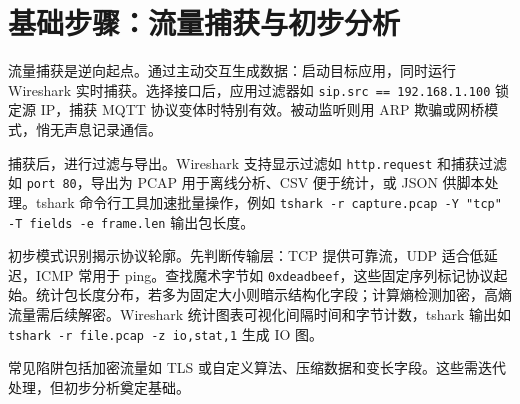 \chapter{基础步骤：流量捕获与初步分析}
流量捕获是逆向起点。通过主动交互生成数据：启动目标应用，同时运行 Wireshark 实时捕获。选择接口后，应用过滤器如 \texttt{sip.src == 192.168.1.100} 锁定源 IP，捕获 MQTT 协议变体时特别有效。被动监听则用 ARP 欺骗或网桥模式，悄无声息记录通信。\par
捕获后，进行过滤与导出。Wireshark 支持显示过滤如 \texttt{http.request} 和捕获过滤如 \texttt{port 80}，导出为 PCAP 用于离线分析、CSV 便于统计，或 JSON 供脚本处理。tshark 命令行工具加速批量操作，例如 \texttt{tshark -r capture.pcap -Y "tcp" -T fields -e frame.len} 输出包长度。\par
初步模式识别揭示协议轮廓。先判断传输层：TCP 提供可靠流，UDP 适合低延迟，ICMP 常用于 ping。查找魔术字节如 \texttt{0xdeadbeef}，这些固定序列标记协议起始。统计包长度分布，若多为固定大小则暗示结构化字段；计算熵检测加密，高熵流量需后续解密。Wireshark 统计图表可视化间隔时间和字节计数，tshark 输出如 \texttt{tshark -r file.pcap -z io,stat,1} 生成 IO 图。\par
常见陷阱包括加密流量如 TLS 或自定义算法、压缩数据和变长字段。这些需迭代处理，但初步分析奠定基础。\par
